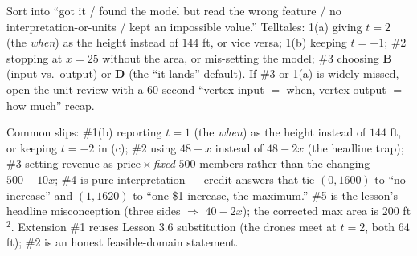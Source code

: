 \documentclass[10pt]{article}
\begin{document}
\begin{teachernote}
Sort into ``got it / found the model but read the wrong feature / no interpretation-or-units / kept an impossible
value.'' Telltales: 1(a) giving $t=2$ (the \emph{when}) as the height instead of $144$ ft, or vice versa; 1(b)
keeping $t=-1$; \#2 stopping at $x=25$ without the area, or mis-setting the model; \#3 choosing \textbf{B} (input vs.\
output) or \textbf{D} (the ``it lands'' default). If \#3 or 1(a) is widely missed, open the unit review with a
60-second ``vertex input $=$ when, vertex output $=$ how much'' recap.
\end{teachernote}

\begin{teachernote}[Homework]
Common slips: \#1(b) reporting $t=1$ (the \emph{when}) as the height instead of $144$ ft, or keeping $t=-2$ in (c);
\#2 using $48-x$ instead of $48-2x$ (the headline trap); \#3 setting revenue as price\,$\times$\,\emph{fixed} $500$
members rather than the changing $500-10x$; \#4 is pure interpretation --- credit answers that tie $(0,1600)$ to ``no
increase'' and $(1,1620)$ to ``one \$1 increase, the maximum.'' \#5 is the lesson's headline misconception (three
sides $\Rightarrow$ $40-2x$); the corrected max area is $200$ ft$^2$. Extension \#1 reuses Lesson 3.6 substitution
(the drones meet at $t=2$, both $64$ ft); \#2 is an honest feasible-domain statement.
\end{teachernote}
\end{document}
